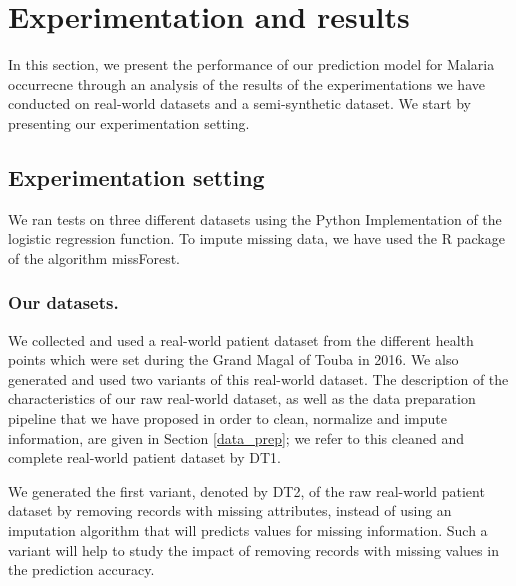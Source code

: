 \section{Experimentation and results}\label{experimentation}
In this section, we present the performance of our prediction
 model for Malaria occurrecne through an analysis of the results
 of the experimentations we have conducted on real-world datasets
and a semi-synthetic dataset. We start by presenting our experimentation setting.
 
\subsection{Experimentation setting}
We ran tests on three different datasets using the Python Implementation of the logistic regression function.
To impute missing data, we have used the R package of the algorithm missForest.

\subsubsection{Our datasets.}
We collected and used a real-world patient dataset from the different health points which were set during the Grand Magal of Touba in 2016.
We also generated and used two variants of this real-world dataset. The description of the characteristics of our raw real-world dataset, as well as the  data preparation
pipeline that we have proposed in order to clean, normalize and impute information, are given in Section \ref{data_prep}; we refer to this cleaned and complete real-world
patient dataset by \textsc{DT1}. 

We generated the first variant, denoted by \textsc{DT2}, of the raw real-world patient dataset by 
removing records with missing attributes, instead of using an imputation algorithm that will predicts 
values for missing information. Such a variant will help to study the impact of removing records with 
missing values in the prediction accuracy.
 
